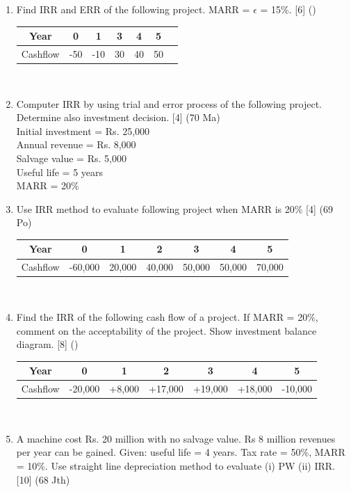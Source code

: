 \documentclass[12pt]{article}
\begin{document}
\begin{enumerate}[noitemsep, topsep = 0pt]
		\item Find IRR and ERR of the following project. MARR = $\epsilon$ = 15\%. \hfill [6] ()
		\begin{tabular}{|c|c|c|c|c|c|c|}
			\hline
			Year & 0 & 1 & 3 & 4 & 5\\ \hline
			Cashflow & -50 & -10 & 30 & 40 & 50\\ \hline
		\end{tabular}\\[0pt]
		
		\item Computer IRR by using trial and error process of the following project. Determine also investment decision. \hfill [4] (70 Ma)\\
		Initial investment = Rs. 25,000\\
		Annual revenue = Rs. 8,000\\
		Salvage value = Rs. 5,000\\
		Useful life = 5 years\\
		MARR = 20\%	
		
		\item Use IRR method to evaluate following project when MARR is 20\% \hfill [4] (69 Po)\\
		\begin{tabular}{|c|c|c|c|c|c|c|}
			\hline
			Year & 0 & 1 & 2 & 3 & 4 & 5\\ \hline
			Cashflow & -60,000 & 20,000 & 40,000 & 50,000 & 50,000 & 70,000\\ \hline
		\end{tabular}\\[0pt]
		
		\item Find the IRR of the following cash flow of a project. If MARR = 20\%, comment on the acceptability of the project. Show investment balance diagram. \hspace{4cm} [8] ()
		\begin{tabular}{|c|c|c|c|c|c|c|}
			\hline
			Year & 0 & 1 & 2 & 3 & 4 & 5\\ \hline
			Cashflow & -20,000 & +8,000 & +17,000 & +19,000 & +18,000 & -10,000\\ \hline
		\end{tabular}\\[0pt]
		
		\item A machine cost Rs. 20 million with no salvage value. Rs 8 million revenues per year can be gained. Given: useful life = 4 years. Tax rate = 50\%, MARR = 10\%. Use straight line depreciation method to evaluate (i) PW (ii) IRR. \hfill [10] (68 Jth)
	\end{enumerate}
\end{document}
